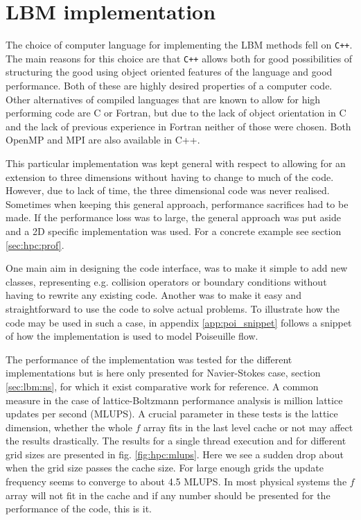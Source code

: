 \section{LBM implementation}
The choice of computer language for implementing the LBM methods fell
on \verb!C++!. The main reasons for this choice are that \verb!C++!
allows both for good possibilities of structuring the good using
object oriented features of the language and good performance. Both of
these are highly desired properties of a computer code. Other
alternatives of compiled languages that are known to allow for high
performing code are C or Fortran, but due to the lack of object
orientation in C and the lack of previous experience in Fortran
neither of those were chosen. Both OpenMP and MPI are also available
in C++.

This particular implementation was kept general with respect to
allowing for an extension to three dimensions without having to change
to much of the code. However, due to lack of time, the three
dimensional code was never realised. Sometimes when keeping this
general approach, performance sacrifices had to be made. If the
performance loss was to large, the general approach was put aside and
a 2D specific implementation was used. For a concrete example see
section \ref{sec:hpc:prof}.

One main aim in designing the code interface, was to make it simple to
add new classes, representing e.g. collision operators or boundary
conditions without having to rewrite any existing code. Another was to
make it easy and straightforward to use the code to solve actual
problems. To illustrate how the code may be used in such a case, in
appendix \ref{app:poi_snippet} follows a snippet of how the
implementation is used to model Poiseuille flow.

The performance of the implementation was tested for the different
implementations but is here only presented for Navier-Stokes case,
section \ref{sec:lbm:ns}, for which it exist comparative work for
reference. A common measure in the case of lattice-Boltzmann
performance analysis is million lattice updates per second (MLUPS). A
crucial parameter in these tests is the lattice dimension, whether the
whole $f$ array fits in the last level cache or not may affect the
results drastically. The results for a single thread execution and for
different grid sizes are presented in fig. \ref{fig:hpc:mlups}. Here
we see a sudden drop about when the grid size passes the cache
size. For large enough grids the update frequency seems to converge to
about 4.5 MLUPS. In most physical systems the $f$ array will not fit
in the cache and if any number should be presented for the performance
of the code, this is it. 

